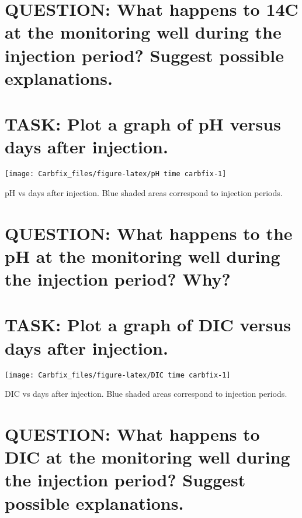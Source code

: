 \documentclass[nofonts,x11names]{tufte-handout}
\begin{document}
\section{QUESTION: What happens to 14C at the monitoring well during the
injection period? Suggest possible
explanations.}\label{question-what-happens-to-14c-at-the-monitoring-well-during-the-injection-period-suggest-possible-explanations.}

\section{TASK: Plot a graph of pH versus days after
injection.}\label{task-plot-a-graph-of-ph-versus-days-after-injection.}

\begin{marginfigure}[0.5cm]
\texttt{[image: Carbfix\_files/figure-latex/pH time carbfix-1]} \caption[pH vs days after injection]{pH vs days after injection.  Blue shaded areas correspond to injection periods.}\label{fig:pH time carbfix}
\end{marginfigure}

\section{QUESTION: What happens to the pH at the monitoring well during
the injection period?
Why?}\label{question-what-happens-to-the-ph-at-the-monitoring-well-during-the-injection-period-why}

\clearpage

\section{TASK: Plot a graph of DIC versus days after
injection.}\label{task-plot-a-graph-of-dic-versus-days-after-injection.}

\begin{marginfigure}[-0.55cm]
\texttt{[image: Carbfix\_files/figure-latex/DIC time carbfix-1]} \caption[DIC vs days after injection]{DIC vs days after injection.  Blue shaded areas correspond to injection periods.}\label{fig:DIC time carbfix}
\end{marginfigure}

\section{QUESTION: What happens to DIC at the monitoring well during the
injection period? Suggest possible
explanations.}\label{question-what-happens-to-dic-at-the-monitoring-well-during-the-injection-period-suggest-possible-explanations.}
\end{document}
